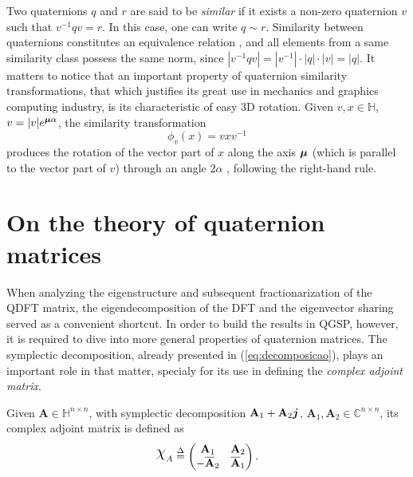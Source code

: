 Two quaternions $ q $ and $ r $ are said to be \emph{similar} if it exists a non-zero quaternion $ v $ such that $ v^{-1}q v = r $. In this case, one can write $ q \sim r $. Similarity between quaternions constitutes an equivalence relation \cite{zhang1997quaternions}, and all elements from a same similarity class possess the same norm, since $ |v^{-1}q v| = |v^{-1}| \cdot |q| \cdot |v| = |q| $. It matters to notice that an important property of quaternion similarity transformations, that which justifies its great use in mechanics and graphics computing industry, is its characteristic of easy 3D rotation. Given $ v,x \in \mathbb{H} $, $ v = |v| e^{\boldsymbol{\mu} \alpha}$, the similarity transformation
\begin{equation}
\label{eq:rotacao}
\phi_v(x) = v x v^{-1}
\end{equation}
produces the rotation of the vector part of $x$ along the axis $ \boldsymbol{\mu} $ (which is parallel to the vector part of $v$) through an angle $ 2\alpha $ \cite{ward2012quaternions}, following the right-hand rule.


\section{On the theory of quaternion matrices}

When analyzing the eigenstructure and subsequent fractionarization of the QDFT matrix, the eigendecomposition of the DFT and the eigenvector sharing served as a convenient shortcut. In order to build the results in QGSP, however, it is required to dive into more general properties of quaternion matrices. The symplectic decomposition, already presented in (\ref{eq:decomposicao}), plays an important role in that matter, specialy for its use in defining the \textit{complex adjoint matrix}.

\begin{definition}
\label{def:complexadjoint}
Given $ \mathbf{A} \in \mathbb{H}^{n \times n} $, with symplectic decomposition $ \mathbf{A}_1 + \mathbf{A}_2 \boldsymbol{j}$, $ \mathbf{A}_1,\mathbf{A}_2 \in \mathbb{C}^{n \times n} $, its complex adjoint matrix is defined as
\begin{equation}
\rchi_{A} \overset{\Delta}{=}
\begin{pmatrix}
\mathbf{A}_1 & \mathbf{A}_2\\ 
- \overline{\mathbf{A}}_2 & \overline{\mathbf{A}}_1
\end{pmatrix}.
\end{equation}
\end{definition}

